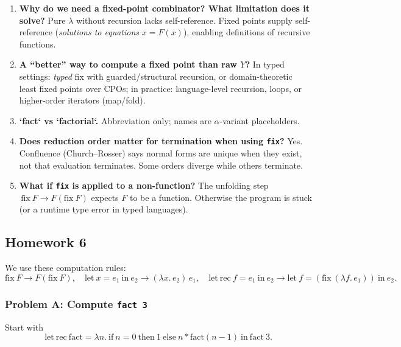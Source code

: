 \documentclass{article}
\theoremstyle{theorem}
\theoremstyle{definition}
\theoremstyle{remark}
\begin{document}
\begin{enumerate}
  \item \textbf{Why do we need a fixed-point combinator? What limitation does it solve?}
  Pure $\lambda$ without recursion lacks self-reference. Fixed points supply self-reference (\emph{solutions to equations} $x=F(x)$), enabling definitions of recursive functions.

  \item \textbf{A ``better'' way to compute a fixed point than raw $Y$?}
  In typed settings: \emph{typed} fix with guarded/structural recursion, or domain-theoretic least fixed points over CPOs; in practice: language-level recursion, loops, or higher-order iterators (map/fold).

  \item \textbf{`fact` vs `factorial`.}
  Abbreviation only; names are $\alpha$-variant placeholders.

  \item \textbf{Does reduction order matter for termination when using \texttt{fix}?}
  Yes. Confluence (Church–Rosser) says normal forms are unique when they exist, not that evaluation terminates. Some orders diverge while others terminate.

  \item \textbf{What if \texttt{fix} is applied to a non-function?}
  The unfolding step $\,\mathrm{fix}\ F \to F(\mathrm{fix}\ F)$ expects $F$ to be a function. Otherwise the program is stuck (or a runtime type error in typed languages).
\end{enumerate}

\subsection{Homework 6}

We use these computation rules:
\[
\mathrm{fix}\ F \to F(\mathrm{fix}\ F),\quad
\mathrm{let}\ x=e_1\ \mathrm{in}\ e_2 \to (\lambda x.\,e_2)\,e_1,\quad
\mathrm{let\ rec}\ f=e_1\ \mathrm{in}\ e_2 \to \mathrm{let}\ f=(\mathrm{fix}\ (\lambda f.\,e_1))\ \mathrm{in}\ e_2.
\]

\subsubsection*{Problem A: Compute \texttt{fact 3}}
Start with
\[
\mathrm{let\ rec}\ \mathrm{fact} = \lambda n.\ \mathrm{if}\ n=0\ \mathrm{then}\ 1\ \mathrm{else}\ n * \mathrm{fact}(n-1)\ \mathrm{in}\ \mathrm{fact}\ 3.
\]
\end{document}

